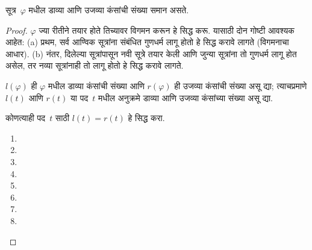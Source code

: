 \begin{lem}
सूत्र~$\varphi$ मधील डाव्या आणि उजव्या कंसांची संख्या समान असते.
\end{lem}

\begin{proof}
$\varphi$ ज्या रीतीने तयार होते तिच्यावर विगमन करून हे सिद्ध करू. यासाठी
दोन गोष्टी आवश्यक आहेत: (a) प्रथम, सर्व आण्विक सूत्रांना संबंधित
गुणधर्म लागू होतो हे सिद्ध करावे लागते (विगमनाचा आधार). (b) नंतर,
दिलेल्या सूत्रांपासून नवी सूत्रे तयार केली आणि जुन्या सूत्रांना तो
गुणधर्म लागू होत असेल, तर नव्या सूत्रांनाही तो लागू होतो हे सिद्ध
करावे लागते.

$l(\varphi)$ ही $\varphi$ मधील डाव्या कंसांची संख्या आणि $r(\varphi)$ ही उजव्या
कंसांची संख्या असू द्या; त्याचप्रमाणे $l(t)$ आणि $r(t)$ या पद~$t$
मधील अनुक्रमे डाव्या आणि उजव्या कंसांच्या संख्या असू द्या.

\begin{prob}
    कोणत्याही पद~$t$ साठी $l(t) = r(t)$ हे सिद्ध करा.
\end{prob}

\begin{enumerate}
\item {}

\item {}

\item {}

\item {}

\item {}

\item {}

\item {}





\item {}
\end{enumerate}
\end{proof}


